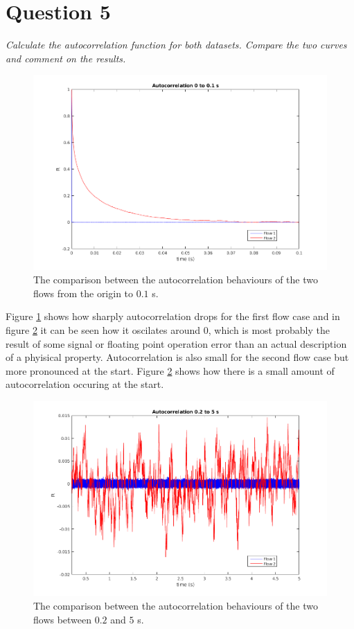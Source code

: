 \section*{Question 5}
\textit{Calculate the autocorrelation function for both datasets. Compare the two curves and comment on the results.}

\begin{figure}[!ht]
\centering
\includegraphics[scale=0.5]{./TEXT/auto1.png}
\caption{The comparison between the autocorrelation behaviours of the two flows from the origin to $0.1$ s.}
\label{auto1}
\end{figure}
Figure \ref{auto1} shows how sharply autocorrelation drops for the first flow case and in figure \ref{auto2} it can be seen how it oscilates around $0$, which is most probably the result of some signal or floating point operation error than an actual description of a phyisical property. Autocorrelation is also small for the second flow case but more pronounced at the start. Figure \ref{auto2} shows how there is a small amount of autocorrelation occuring at the start.
\begin{figure}[!ht]
\centering
\includegraphics[scale=0.5]{./TEXT/auto2.png}
\caption{The comparison between the autocorrelation behaviours of the two flows between $0.2$ and $5$ s.}
\label{auto2}
\end{figure}